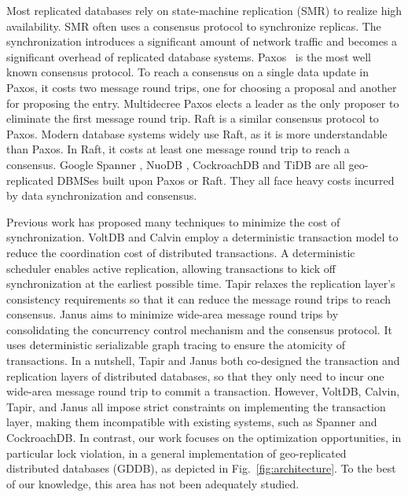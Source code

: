 \documentclass[conference]{IEEEtran}
\begin{document}
Most replicated databases rely on state-machine replication (SMR) to realize high availability.
SMR often uses a consensus protocol to synchronize replicas.
The synchronization introduces a significant amount of network traffic and becomes a significant overhead of replicated database systems.
Paxos~\cite{Paxos:journals/tocs/Lamport98}\cite{PaxosSimple:conf/opodis/Lamport02} is the most well known consensus protocol.
To reach a consensus on a single data update in Paxos, it costs two message round trips, one for choosing a proposal and another for proposing the entry.
Multidecree Paxos\cite{Multidecree:journals/csur/RenesseA15} elects a leader as the only proposer to eliminate the first message round trip.
Raft\cite{Raft:conf/usenix/OngaroO14} is a similar consensus protocol to Paxos.
Modern database systems widely use Raft, as it is more understandable than Paxos.
In Raft, it costs at least one message round trip to reach a consensus.
Google Spanner \cite{Spanner:conf/osdi/CorbettDEFFFGGHHHKKLLMMNQRRSSTWW12}\cite{Spanner:conf/sigmod/BaconBBCDFFGJKL17},
NuoDB \cite{NuoDB}, CockroachDB \cite{CockroachDB} and TiDB \cite{TiDB} are all geo-replicated DBMSes built upon Paxos or Raft.
They all face heavy costs incurred by data synchronization and consensus.

Previous work has proposed many techniques
to minimize the cost of synchronization.
VoltDB \cite{VoltDB} and Calvin \cite{Calvin:conf/sigmod/ThomsonDWRSA12} employ a deterministic transaction model
to reduce the coordination cost of distributed transactions.
A deterministic scheduler enables active replication, allowing transactions to kick off synchronization at the earliest possible time.
Tapir \cite{Tapir:conf/sosp/ZhangSSKP15} relaxes the replication layer's consistency requirements so that it can reduce the message round trips to reach consensus.
Janus \cite{Janus:conf/osdi/MuNLL16} aims to minimize wide-area message round trips
by consolidating the concurrency control mechanism and the consensus protocol.
It uses deterministic serializable graph tracing to ensure the atomicity of transactions.
In a nutshell, Tapir and Janus both co-designed the transaction and replication layers of distributed databases, so that they only need to incur one wide-area message round trip to commit a transaction.
However, VoltDB, Calvin, Tapir, and Janus all impose strict constraints on implementing the transaction layer, making them incompatible with existing systems, such as Spanner and CockroachDB.
In contrast, our work focuses on the optimization opportunities, in particular lock violation, in a general implementation of geo-replicated distributed databases (GDDB), as depicted in Fig.~\ref{fig:architecture}.
To the best of our knowledge, this area has not been adequately studied.
\end{document}
